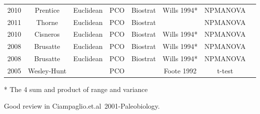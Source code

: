 \documentclass[12pt,letterpaper]{article}
\begin{document}
\begin{table}[ht]
\begin{tabular}{cccccccc}
    2010 & Prentice    & Euclidean & PCO        & Biostrat   & Wills 1994* & NPMANOVA   & \cite{prentice2011} \\
    2011 & Thorne      & Euclidean & PCO        & Biostrat   &             & NPMANOVA   & \cite{thorneresetting2011} \\
    2010 & Cisneros    & Euclidean & PCO        & Biostrat   & Wills 1994* & NPMANOVA   & \cite{cisneros2010} \\
    2008 & Brusatte    & Euclidean & PCO        & Biostrat   & Wills 1994* & NPMANOVA   & \cite{brusatte50} \\
    2008 & Brusatte    & Euclidean & PCO        & Biostrat   & Wills 1994* & NPMANOVA   & \cite{Brusatte12092008} \\
    2005 & Wesley-Hunt &           & PCO        &            & Foote 1992  & t-test     & \cite{Wesley-Hunt2005} \\
  \hline
\end{tabular}
\end{table}
* The 4 sum and product of range and variance



Good review in Ciampaglio.et.al~2001-Paleobiology.
\end{document}
